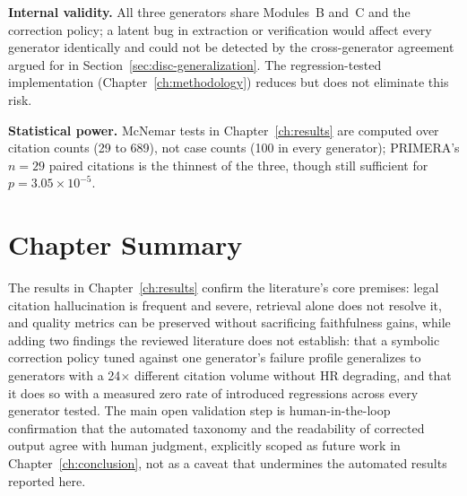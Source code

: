 \textbf{Internal validity.} All three generators share Modules~B and~C and the correction policy; a latent bug in extraction or verification would affect every generator identically and could not be detected by the cross-generator agreement argued for in Section~\ref{sec:disc-generalization}. The regression-tested implementation (Chapter~\ref{ch:methodology}) reduces but does not eliminate this risk.

\textbf{Statistical power.} McNemar tests in Chapter~\ref{ch:results} are computed over citation counts (29 to 689), not case counts (100 in every generator); PRIMERA's $n=29$ paired citations is the thinnest of the three, though still sufficient for $p=3.05\times10^{-5}$.

\section{Chapter Summary}
\label{sec:disc-summary}

The results in Chapter~\ref{ch:results} confirm the literature's core premises: legal citation hallucination is frequent and severe, retrieval alone does not resolve it, and quality metrics can be preserved without sacrificing faithfulness gains, while adding two findings the reviewed literature does not establish: that a symbolic correction policy tuned against one generator's failure profile generalizes to generators with a 24$\times$ different citation volume without HR degrading, and that it does so with a measured zero rate of introduced regressions across every generator tested. The main open validation step is human-in-the-loop confirmation that the automated taxonomy and the readability of corrected output agree with human judgment, explicitly scoped as future work in Chapter~\ref{ch:conclusion}, not as a caveat that undermines the automated results reported here.
